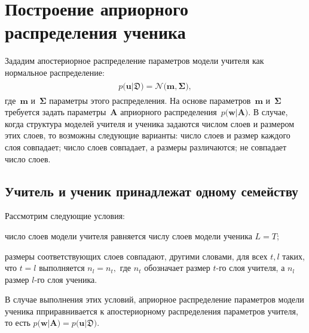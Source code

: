 \documentclass[12pt]{a&t}
\begin{document}
\section{Построение априорного распределения ученика}
Зададим апостериорное распределение параметров модели учителя как нормальное распределение:
\begin{gather}
\label{eq:ap:1}
\begin{aligned}
p\bigr(\mathbf{u}|\mathfrak{D}\bigr) = \mathcal{N}\bigr(\mathbf{m}, \bm{\Sigma}\bigr),
\end{aligned}
\end{gather}
где~$\mathbf{m}$ и~$\bm{\Sigma}$ параметры этого распределения. На основе параметров~$\mathbf{m}$ и~$\bm{\Sigma}$ требуется задать параметры~$\mathbf{A}$ априорного распределения~$p\bigr(\mathbf{w}|\mathbf{A}\bigr).$ В случае, когда структура моделей учителя и ученика задаются числом слоев и размером этих слоев, то возможны следующие варианты: число слоев и размер каждого слоя совпадает; число слоев совпадает, а размеры различаются; не совпадает число слоев.

\subsection{Учитель и ученик принадлежат одному семейству}
\label{section:one:space}
Рассмотрим следующие условия:
\begin{enumlist}
    \item число слоев модели учителя равняется числу слоев модели ученика $L=T$;
    \item размеры соответствующих слоев совпадают, другими словами, для всех $t, l$ таких, что $t=l$ выполняется $n_l = n_t,$ где $n_t$ обозначает размер $t$-го слоя учителя, а $n_l$ размер $l$-го слоя ученика.
\end{enumlist}
В случае выполнения этих условий, априорное распределение параметров модели ученика пприравнивается к апостериорному распределения параметров учителя, то есть $p\bigr(\mathbf{w}|\mathbf{A}\bigr) = p\bigr(\mathbf{u}|\mathfrak{D}\bigr)$.
\end{document}
